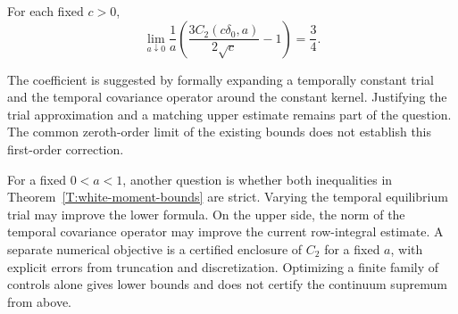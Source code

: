 \begin{conjecture}
  \label{Conj:white-first-correction}
  For each fixed $c > 0$,
  \[
    \lim_{a\downarrow0}\frac1a
    \left(\frac{3C_2(c\delta_0,a)}{2\sqrt c}-1\right)
    =\frac34.
  \]
\end{conjecture}

The coefficient is suggested by formally expanding a temporally constant
trial and the temporal covariance operator around the constant kernel.
Justifying the trial approximation and a matching upper estimate remains part
of the question. The common zeroth-order limit of the existing bounds does
not establish this first-order correction.

For a fixed $0 < a < 1$, another question is whether both inequalities in
Theorem~\ref{T:white-moment-bounds} are strict. Varying the temporal equilibrium
trial may improve the lower formula. On the upper side, the norm of the
temporal covariance operator may improve the current row-integral estimate.
A separate numerical objective is a certified enclosure of $C_2$ for a fixed
$a$, with explicit errors from truncation and discretization. Optimizing a
finite family of controls alone gives lower bounds and does not certify the
continuum supremum from above.
